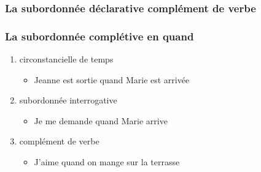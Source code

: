 \documentclass[UTF8]{report}
\begin{document}
\subsubsection{La subordonnée déclarative complément de verbe}

\subsubsection{La subordonnée complétive en quand}

\begin{enumerate}
    \item circonstancielle de temps
    \begin{itemize}
        \item Jeanne est sortie quand Marie est arrivée
    \end{itemize}
    \item subordonnée interrogative
    \begin{itemize}
        \item Je me demande quand Marie arrive
    \end{itemize}
    \item complément de verbe
    \begin{itemize}
        \item J’aime quand on mange sur la terrasse
    \end{itemize}
\end{enumerate}
\end{document}
